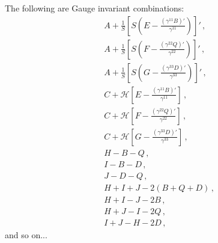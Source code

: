 \documentclass{article}
\newcommand*\scr[1]{\mathscr{#1}}
\newcommand*\p[1]{\left(#1\right)}
\newcommand*\ps[1]{\left[#1\right]}
\newcommand*\f[2]{\frac{#1}{#2}}
\begin{document}
The following are Gauge invariant combinations:
\begin{align}
&A+\f1S\ps{S\p{E-\f{(\gamma^{11} B)'}{\gamma^{11}}}}'\,,\\
&A+\f1S\ps{S\p{F-\f{(\gamma^{22} Q)'}{\gamma^{22}}}}'\,,\\
&A+\f1S\ps{S\p{G-\f{(\gamma^{33} D)'}{\gamma^{33}}}}'\,,\\
&C+\scr H\ps{E-\f{(\gamma^{11}B)'}{\gamma^{11}}}\,,\\
&C+\scr H\ps{F-\f{(\gamma^{22}Q)'}{\gamma^{22}}}\,,\\
&C+\scr H\ps{G-\f{(\gamma^{33}D)'}{\gamma^{33}}}\,,\\
&H-B-Q\,,\\
&I-B-D\,,\\
&J-D-Q\,,\\
&H+I+J-2(B+Q+D)\,,\\
&H+I-J-2B\,,\\
&H+J-I-2Q\,,\\
&I+J-H-2D\,,
\end{align}
and so on...
\\\\
\end{document}
